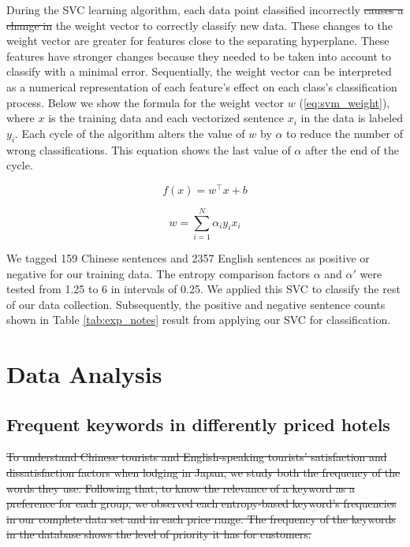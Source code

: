 \documentclass[smallextended,natbib]{svjour3}       %
\providecommand{\DIFadd}[1]{{\protect\color{blue}\uwave{#1}}} %
\providecommand{\DIFdel}[1]{{\protect\color{red}\sout{#1}}}                      %
\providecommand{\DIFaddbegin}{} %
\providecommand{\DIFaddend}{} %
\providecommand{\DIFdelbegin}{} %
\providecommand{\DIFdelend}{} %
\newcommand{\DIFscaledelfig}{0.5}
\newlength{\DIFdelgraphicswidth} %
\newlength{\DIFdelgraphicsheight} %
\newcommand{\DIFaddincludegraphics}[2][]{{\color{blue}\fbox{\DIFOincludegraphics[#1]{#2}}}} %
\newcommand{\DIFdelincludegraphics}[2][]{%
\sbox{\DIFdelgraphicsbox}{\DIFOincludegraphics[#1]{#2}}%
\settoboxwidth{\DIFdelgraphicswidth}{\DIFdelgraphicsbox} %
\settoboxtotalheight{\DIFdelgraphicsheight}{\DIFdelgraphicsbox} %
\scalebox{\DIFscaledelfig}{%
\parbox[b]{\DIFdelgraphicswidth}{\usebox{\DIFdelgraphicsbox}\\[-\baselineskip] \rule{\DIFdelgraphicswidth}{0em}}\llap{\resizebox{\DIFdelgraphicswidth}{\DIFdelgraphicsheight}{%
\setlength{\unitlength}{\DIFdelgraphicswidth}%
\begin{picture}(1,1)%
\thicklines\linethickness{2pt} %
{\color[rgb]{1,0,0}\put(0,0){\framebox(1,1){}}}%
{\color[rgb]{1,0,0}\put(0,0){\line( 1,1){1}}}%
{\color[rgb]{1,0,0}\put(0,1){\line(1,-1){1}}}%
\end{picture}%
}\hspace*{3pt}}} %
} %
\DeclareRobustCommand{\DIFaddbegin}{\DIFOaddbegin \let\includegraphics\DIFaddincludegraphics} %
\DeclareRobustCommand{\DIFaddend}{\DIFOaddend \let\includegraphics\DIFOincludegraphics} %
\DeclareRobustCommand{\DIFdelbegin}{\DIFOdelbegin \let\includegraphics\DIFdelincludegraphics} %
\DeclareRobustCommand{\DIFdelend}{\DIFOaddend \let\includegraphics\DIFOincludegraphics} %
\begin{document}
    During the SVC learning algorithm, each data point classified incorrectly \DIFdelbegin \DIFdel{causes a change in }\DIFdelend \DIFaddbegin \DIFadd{alters }\DIFaddend the weight vector to correctly classify new data. These changes to the weight vector are greater for features close to the separating hyperplane. These features have stronger changes because they needed to be taken into account to classify with a minimal error. Sequentially, the weight vector can be interpreted as a numerical representation of each feature's effect on each class's classification process. Below we show the formula for the weight vector \(w\) (\ref{eq:svm_weight}), where \(x\) is the training data and each vectorized sentence \(x_i\) in the data is labeled \(y_i\). Each cycle of the algorithm alters the value of \(w\) by \(\alpha\) to reduce the number of wrong classifications. This equation shows the last value of \(\alpha\) after the end of the cycle.

    \begin{equation}\label{eq:svm1}
    f(x) = w^\top x + b
    \end{equation}

    \begin{equation}\label{eq:svm_weight}
    w = \sum_{i=1}^N \alpha_i y_i x_i
    \end{equation}

    We tagged 159 Chinese sentences and \num[group-separator={,}]{2357} English sentences as positive or negative for our training data. The entropy comparison factors \(\alpha\) and \(\alpha'\) were tested from 1.25 to 6 in intervals of 0.25. We applied this SVC to classify the rest of our data collection. Subsequently, the positive and negative sentence counts shown in Table \ref{tab:exp_notes} result from applying our SVC for classification.

\section{Data Analysis}\label{dataanalysis}

  \subsection{Frequent keywords in differently priced hotels}\label{svmresults}

    \DIFdelbegin \DIFdel{To understand Chinese tourists and English-speaking tourists' satisfaction and dissatisfaction factors when lodging in Japan, we study both the frequency of the words they use. Following that, to know the relevance of a keyword as a preference for each group, we observed each entropy-based keyword's frequencies in our complete data set and in each price range. The frequency of the keywords in the database shows the level of priority it has for customers.
}%
\end{document}
